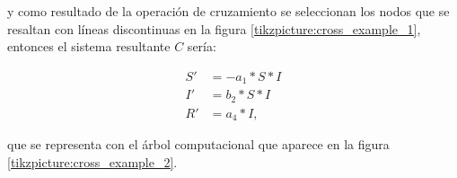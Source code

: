 

y como resultado de la operación de cruzamiento se seleccionan los nodos que se resaltan con líneas discontinuas en la figura \ref{tikzpicture:cross_example_1}, entonces el sistema resultante $C$ sería:

\begin{align*}
    S' & = - a_1 * S * I \\
    I' & = b_2 * S * I   \\
    R' & = a_4 * I,
\end{align*}

que se representa con el árbol computacional que aparece en la figura \ref{tikzpicture:cross_example_2}.


